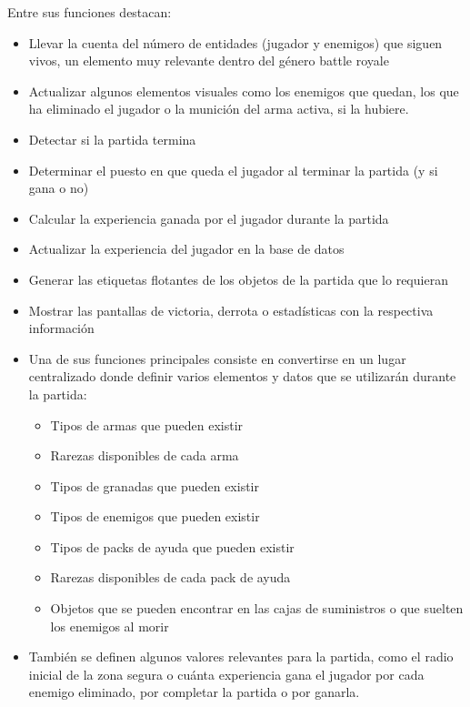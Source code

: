 Entre sus funciones destacan:
\begin{itemize}
    \item Llevar la cuenta del número de entidades (jugador y enemigos) que siguen vivos, un elemento muy relevante dentro del género battle royale
    \item Actualizar algunos elementos visuales como los enemigos que quedan, los que ha eliminado el jugador o la munición del arma activa, si la hubiere.
    \item Detectar si la partida termina
    \item Determinar el puesto en que queda el jugador al terminar la partida (y si gana o no)
    \item Calcular la experiencia ganada por el jugador durante la partida
    \item Actualizar la experiencia del jugador en la base de datos
    \item Generar las etiquetas flotantes de los objetos de la partida que lo requieran
    \item Mostrar las pantallas de victoria, derrota o estadísticas con la respectiva información
    \item Una de sus funciones principales consiste en convertirse en un lugar centralizado donde definir varios elementos y datos que se utilizarán durante la partida:
    \begin{itemize}
    \item Tipos de armas que pueden existir
    \item Rarezas disponibles de cada arma
    \item Tipos de granadas que pueden existir
    \item Tipos de enemigos que pueden existir
    \item Tipos de packs de ayuda que pueden existir
    \item Rarezas disponibles de cada pack de ayuda
    \item Objetos que se pueden encontrar en las cajas de suministros o que suelten los enemigos al morir
    \end{itemize}
    \item También se definen algunos valores relevantes para la partida, como el radio inicial de la zona segura o cuánta experiencia gana el jugador por cada enemigo eliminado, por completar la partida o por ganarla.
\end{itemize}
